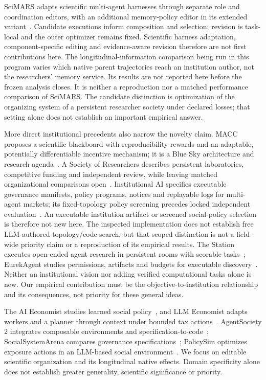 SciMARS adapts scientific multi-agent harnesses through separate role and
coordination editors, with an additional memory-policy editor in its extended
variant~\citep{wu2026scimars}. Candidate executions inform composition and
selection; revision is task-local and the outer optimizer remains fixed.
Scientific harness adaptation, component-specific editing and evidence-aware
revision therefore are not first contributions here. The longitudinal-information
comparison being run in this program varies which native parent trajectories
reach an institution author, not the researchers' memory service. Its results
are not reported here before the frozen analysis closes. It is neither a reproduction nor a matched
performance comparison of SciMARS. The candidate distinction is optimization
of the organizing system of a persistent researcher society under declared
losses; that setting alone does not establish an important empirical answer.

More direct institutional precedents also narrow the novelty claim. MACC
proposes a scientific blackboard with reproducibility rewards and an
adaptable, potentially differentiable incentive mechanism; it is a Blue Sky
architecture and research agenda~\citep{oyama2026macc}. A Society of Researchers
describes persistent laboratories, competitive funding and independent review,
while leaving matched organizational comparisons open~\citep{asaria2026society}.
Institutional AI specifies executable governance manifests, policy programs,
notices and replayable logs for multi-agent markets; its fixed-topology policy
screening precedes locked independent evaluation~\citep{bracale2026institutional}.
An executable institution artifact or screened social-policy selection is
therefore not new here. The inspected implementation does not establish free
LLM-authored topology/code search, but that scoped distinction is not a field-wide
priority claim or a reproduction of its empirical results.
The Station executes open-ended agent research in persistent rooms with
scorable tasks~\citep{chung2025station}; EurekAgent studies permissions,
artifacts and budgets for executable discovery~\citep{xin2026eurekagent}.
Neither an institutional vision nor adding verified computational tasks alone
is new. Our empirical contribution must be the objective-to-institution
relationship and its consequences, not priority for these general ideas.

The AI Economist studies learned social policy~\citep{zheng2020economist}, and
LLM Economist adapts workers and a planner through context under bounded tax
actions~\citep{karten2025economist}. AgentSociety 2 integrates composable
environments and specification-to-code~\citep{piao2026agentsociety2};
SocialSystemArena compares governance specifications~\citep{fei2026institutions};
PolicySim optimizes exposure actions in an LLM-based social
environment~\citep{huang2026policysim}. We focus on editable scientific
organization and its longitudinal native effects. Domain specificity alone
does not establish greater generality, scientific significance or priority.

